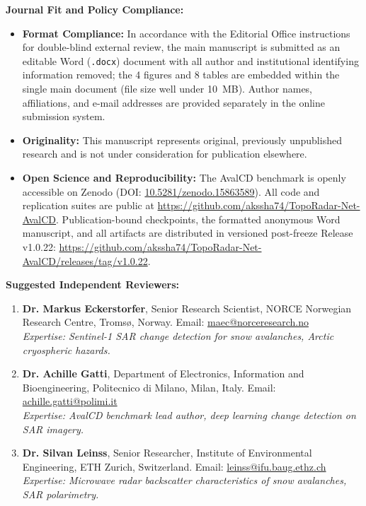 \documentclass[11pt,a4paper]{article}
\begin{document}
\medskip
\noindent
\textbf{Journal Fit and Policy Compliance:}
\begin{itemize}
    \item \textbf{Format Compliance:} In accordance with the Editorial Office instructions for double-blind external review, the main manuscript is submitted as an editable Word (\texttt{.docx}) document with all author and institutional identifying information removed; the 4 figures and 8 tables are embedded within the single main document (file size well under 10~MB). Author names, affiliations, and e-mail addresses are provided separately in the online submission system.
    \item \textbf{Originality:} This manuscript represents original, previously unpublished research and is not under consideration for publication elsewhere.
    \item \textbf{Open Science and Reproducibility:} The AvalCD benchmark is openly accessible on Zenodo (DOI: \href{https://doi.org/10.5281/zenodo.15863589}{10.5281/zenodo.15863589}). All code and replication suites are public at \url{https://github.com/akssha74/TopoRadar-Net-AvalCD}. Publication-bound checkpoints, the formatted anonymous Word manuscript, and all artifacts are distributed in versioned post-freeze Release v1.0.22: \url{https://github.com/akssha74/TopoRadar-Net-AvalCD/releases/tag/v1.0.22}.
\end{itemize}

\medskip
\noindent
\textbf{Suggested Independent Reviewers:}
\begin{enumerate}
    \item \textbf{Dr. Markus Eckerstorfer}, Senior Research Scientist, NORCE Norwegian Research Centre, Troms{\o}, Norway. Email: \href{mailto:maec@norceresearch.no}{maec@norceresearch.no} \\
    \textit{Expertise: Sentinel-1 SAR change detection for snow avalanches, Arctic cryospheric hazards.}
    \item \textbf{Dr. Achille Gatti}, Department of Electronics, Information and Bioengineering, Politecnico di Milano, Milan, Italy. Email: \href{mailto:achille.gatti@polimi.it}{achille.gatti@polimi.it} \\
    \textit{Expertise: AvalCD benchmark lead author, deep learning change detection on SAR imagery.}
    \item \textbf{Dr. Silvan Leinss}, Senior Researcher, Institute of Environmental Engineering, ETH Zurich, Switzerland. Email: \href{mailto:leinss@ifu.baug.ethz.ch}{leinss@ifu.baug.ethz.ch} \\
    \textit{Expertise: Microwave radar backscatter characteristics of snow avalanches, SAR polarimetry.}
\end{enumerate}
\end{document}
